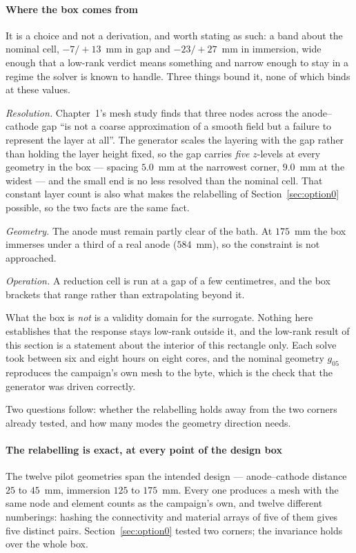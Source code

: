 \documentclass[11pt,a4paper]{article}
\theoremstyle{plain}
\theoremstyle{definition}
\theoremstyle{remark}
\begin{document}
\paragraph{Where the box comes from}
It is a choice and not a derivation, and worth stating as such: a band about the
nominal cell, $-7/+13$~mm in gap and $-23/+27$~mm in immersion, wide enough that
a low-rank verdict means something and narrow enough to stay in a regime the
solver is known to handle. Three things bound it, none of which binds at these
values.

\emph{Resolution.} Chapter~1's mesh study finds that three nodes across the
anode--cathode gap ``is not a coarse approximation of a smooth field but a
failure to represent the layer at all''. The generator scales the layering with
the gap rather than holding the layer height fixed, so the gap carries
\emph{five} $z$-levels at every geometry in the box --- spacing $5.0$~mm at the
narrowest corner, $9.0$~mm at the widest --- and the small end is no less
resolved than the nominal cell. That constant layer count is also what makes the
relabelling of Section~\ref{sec:option0} possible, so the two facts are the same
fact.

\emph{Geometry.} The anode must remain partly clear of the bath. At $175$~mm the
box immerses under a third of a real anode ($584$~mm), so the constraint is not
approached.

\emph{Operation.} A reduction cell is run at a gap of a few centimetres, and the
box brackets that range rather than extrapolating beyond it.

What the box is \emph{not} is a validity domain for the surrogate. Nothing here
establishes that the response stays low-rank outside it, and the low-rank result
of this section is a statement about the interior of this rectangle only. Each
solve took between six and eight hours on eight cores, and the nominal geometry
$g_{05}$ reproduces the campaign's own mesh to the byte, which is the check that
the generator was driven correctly.

Two questions follow: whether the relabelling holds away from the two corners
already tested, and how many modes the geometry direction needs.

\paragraph{The relabelling is exact, at every point of the design box}
The twelve pilot geometries span the intended design --- anode--cathode distance
$25$ to $45$~mm, immersion $125$ to $175$~mm. Every one produces a mesh with the
same node and element counts as the campaign's own, and twelve different
numberings: hashing the connectivity and material arrays of five of them gives
five distinct pairs. Section~\ref{sec:option0} tested two corners; the
invariance holds over the whole box.
\end{document}
